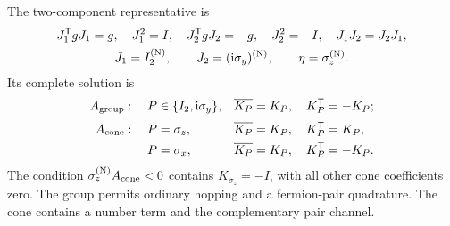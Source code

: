 The two-component representative is
\begin{equation}
\begin{gathered}
J_1^{\mathsf{T}} gJ_1=g,\quad J_1^2=I,\quad
J_2^{\mathsf{T}} gJ_2=-g,\quad J_2^2=-I,\quad
J_1J_2=J_2J_1,\\
J_1=I_2^{({\rm N})},\qquad J_2=(\mathrm{i}\sigma_y)^{({\rm N})},\qquad \eta=\sigma_z^{({\rm N})}.
\end{gathered}
\end{equation}
Its complete solution is
\begin{align*}
A_{\rm group}:\quad
P&\in\{I_2,\mathrm{i}\sigma_y\},&&\overline{K_P}=K_P,\quad K_P^{\mathsf{T}}=-K_P;\\[2pt]
A_{\rm cone}:\quad
P&=\sigma_z,&&\overline{K_P}=K_P,\quad K_P^{\mathsf{T}}=K_P,\\
P&=\sigma_x,&&\overline{K_P}=K_P,\quad K_P^{\mathsf{T}}=-K_P.
\end{align*}
The condition \(\sigma_z^{({\rm N})}A_{\rm cone}<0\) contains
\(K_{\sigma_z}=-I\), with all other cone coefficients zero.  The group permits ordinary hopping and a fermion-pair quadrature.  The cone contains a number term and the complementary pair channel.

